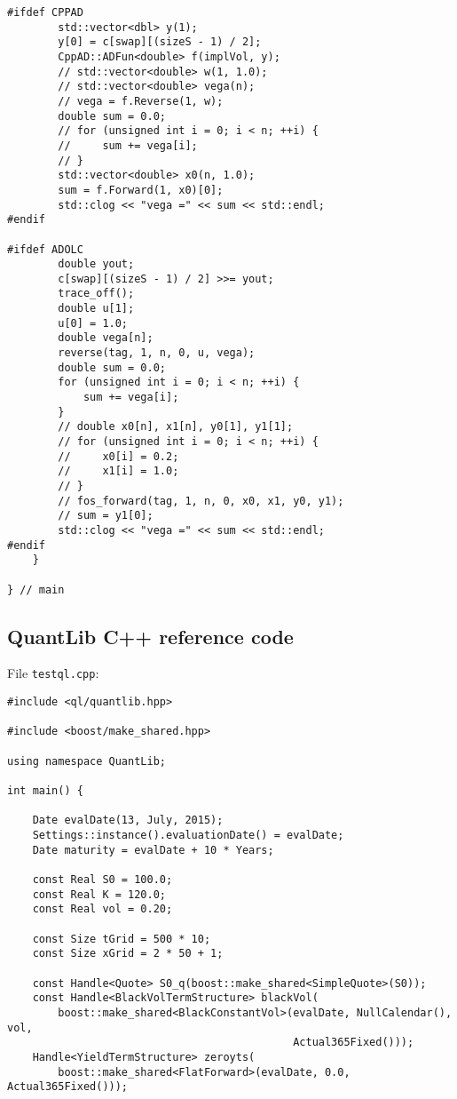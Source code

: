 \documentclass{amsart}
\theoremstyle{plain}
\numberwithin{equation}{section}
\begin{document}
\begin{appendix}
\begin{verbatim}
#ifdef CPPAD
        std::vector<dbl> y(1);
        y[0] = c[swap][(sizeS - 1) / 2];
        CppAD::ADFun<double> f(implVol, y);
        // std::vector<double> w(1, 1.0);
        // std::vector<double> vega(n);
        // vega = f.Reverse(1, w);
        double sum = 0.0;
        // for (unsigned int i = 0; i < n; ++i) {
        //     sum += vega[i];
        // }
        std::vector<double> x0(n, 1.0);
        sum = f.Forward(1, x0)[0];
        std::clog << "vega =" << sum << std::endl;
#endif

#ifdef ADOLC
        double yout;
        c[swap][(sizeS - 1) / 2] >>= yout;
        trace_off();
        double u[1];
        u[0] = 1.0;
        double vega[n];
        reverse(tag, 1, n, 0, u, vega);
        double sum = 0.0;
        for (unsigned int i = 0; i < n; ++i) {
            sum += vega[i];
        }
        // double x0[n], x1[n], y0[1], y1[1];
        // for (unsigned int i = 0; i < n; ++i) {
        //     x0[i] = 0.2;
        //     x1[i] = 1.0;
        // }
        // fos_forward(tag, 1, n, 0, x0, x1, y0, y1);
        // sum = y1[0];
        std::clog << "vega =" << sum << std::endl;
#endif
    }

} // main
\end{verbatim}

\subsection{QuantLib C++ reference code}

File \verb+testql.cpp+:

\begin{verbatim}
#include <ql/quantlib.hpp>

#include <boost/make_shared.hpp>

using namespace QuantLib;

int main() {

    Date evalDate(13, July, 2015);
    Settings::instance().evaluationDate() = evalDate;
    Date maturity = evalDate + 10 * Years;

    const Real S0 = 100.0;
    const Real K = 120.0;
    const Real vol = 0.20;

    const Size tGrid = 500 * 10;
    const Size xGrid = 2 * 50 + 1;

    const Handle<Quote> S0_q(boost::make_shared<SimpleQuote>(S0));
    const Handle<BlackVolTermStructure> blackVol(
        boost::make_shared<BlackConstantVol>(evalDate, NullCalendar(), vol,
                                             Actual365Fixed()));
    Handle<YieldTermStructure> zeroyts(
        boost::make_shared<FlatForward>(evalDate, 0.0, Actual365Fixed()));


\end{verbatim}
\end{appendix}
\end{document}
